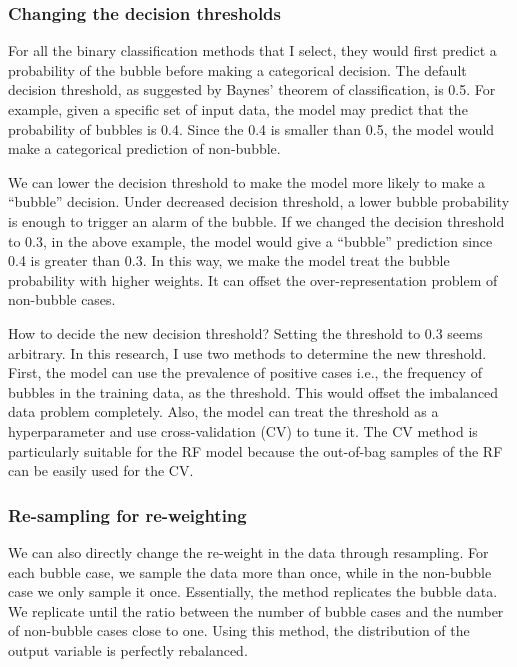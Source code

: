 \documentclass[12pt, man, a4paper, floatsintext]{apa7}
\begin{document}
\subsubsection{Changing the decision thresholds}

For all the binary classification methods that I select, they would first predict a probability of the bubble before making a categorical decision. The default decision threshold, as suggested by Baynes’ theorem of classification, is 0.5. For example, given a specific set of input data, the model may predict that the probability of bubbles is 0.4. Since the 0.4 is smaller than 0.5, the model would make a categorical prediction of non-bubble.

We can lower the decision threshold to make the model more likely to make a “bubble” decision. Under decreased decision threshold, a lower bubble probability is enough to trigger an alarm of the bubble. If we changed the decision threshold to 0.3, in the above example, the model would give a “bubble” prediction since 0.4 is greater than 0.3. In this way, we make the model treat the bubble probability with higher weights. It can offset the over-representation problem of non-bubble cases.

How to decide the new decision threshold? Setting the threshold to 0.3 seems arbitrary. In this research, I use two methods to determine the new threshold. First, the model can use the prevalence of positive cases i.e., the frequency of bubbles in the training data, as the threshold. This would offset the imbalanced data problem completely. Also, the model can treat the threshold as a hyperparameter and use cross-validation (CV) to tune it. The CV method is particularly suitable for the RF model because the out-of-bag samples of the RF can be easily used for the CV. 

\subsubsection{Re-sampling for re-weighting}

We can also directly change the re-weight in the data through resampling. For each bubble case, we sample the data more than once, while in the non-bubble case we only sample it once. Essentially, the method replicates the bubble data. We replicate until the ratio between the number of bubble cases and the number of non-bubble cases close to one. Using this method, the distribution of the output variable is perfectly rebalanced.
\end{document}
